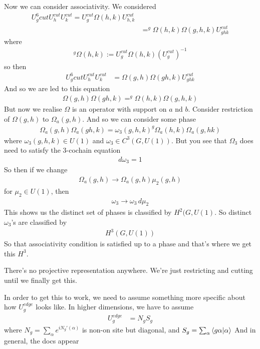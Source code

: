 Now we can consider associativity.
We considered
\begin{align}
    U_g^6cut U_h^{cut} U_k^{cut}
    =
    U_g^{cut}
    \Omega(h, k)
    U_{h,k}^{cut}\\
    &=
    ^g\Omega(h, k)\Omega(g, h, k) U_{ghk}^{cut}
\end{align} 
where
\begin{align}
    ^g\Omega(h, k)
    :=
    U_g^{cut} \Omega(h, k)
    \left( U_g^{cut} \right)^{-1}
\end{align}
so then
\begin{align}
    U_g^6cut U_h^{cut} U_k^{cut}
    &=
    \Omega(g, h)
    \Omega(gh, k)
    U_{ghk}^{cut}
\end{align}
And so we are led to this equation
\begin{align}
    \Omega(g, h) \Omega(gh, k)
    =
    ^g\Omega(h, k)
    \Omega(g, h, k)
\end{align}
But now we realise $\Omega$ is an operator with support on $a$ nd $b$.
Consider restriction of $\Omega(g, h)$
to $\Omega_a(g, h)$.
And so we can consider some phase
\begin{align}
    \Omega_a(g, h)
    \Omega_a(gh, k)
    =
    \omega_3(g, h, k)
    ^g\Omega_a(h, k)
    \Omega_a(g, hk)
\end{align}
where $\omega_3(g,h,k) \in U(1)$
and $\omega_3 \in C^3(G, U(1))$.
But you see that $\Omega_3$ does need to satisfy the $3$-cochain equation
\begin{align}
    d\omega_3 = 1
\end{align}
So then if we change
\begin{align}
    \Omega_a(g, h)
    \to
    \Omega_a(g, h)
    \mu_2(g,h)
\end{align}
for $\mu_2\in U(1)$,
then
\begin{align}
    \omega_3 \to \omega_3\, d\mu_2
\end{align}
This shows us the distinct set of phases is classified by $H^2(G,U(1)$.
So distinct $\omega_3$'s are classified by
\begin{align}
    H^3(G, U(1))
\end{align}
So that associativity condition is satisfied up to a phase and that's where we
get this $H^3$.

There's no projective representation anywhere.
We're just restricting and cutting
until we finally get this.

In order to get this to work,
we need to assume something more specific about how $U_g^{edge}$ looks like.
In higher dimensions,
we have to assume
\begin{align}
    U_g^{edge}
    &=
    N_g
    S_g
\end{align}
where $N_g=\sum_\alpha e^{i N_g'(\alpha)}$ is non-on site but diagonal,
and $S_g=\sum_\alpha \bra{g \alpha}\ket{\alpha}$
And in general,
the docs appear 

